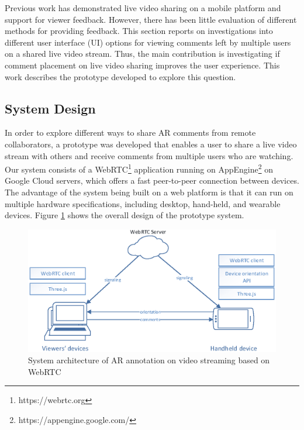 Previous work has demonstrated live video sharing on a mobile platform and support for viewer feedback. However, there has been little evaluation of different methods for providing feedback. This section reports on investigations into different user interface (UI) options for viewing comments left by multiple users on a shared live video stream. Thus, the main contribution is investigating if comment placement on live video sharing improves the user experience. This work describes the prototype developed to explore this question.

\subsection{System Design}

In order to explore different ways to share AR comments from remote collaborators, a prototype was developed that enables a user to share a live video stream with others and receive comments from multiple users who are watching. Our system consists of a WebRTC\footnote{https://webrtc.org} application running on AppEngine\footnote{https://appengine.google.com/} on Google Cloud servers, which offers a fast peer-to-peer connection between devices. The advantage of the system being built on a web platform is that it can run on multiple hardware specifications, including desktop, hand-held, and wearable devices. Figure \ref{fig:mgia16:system} shows the overall design of the prototype system.

\begin{figure}[ht]
  \centering
  \includegraphics[width=\linewidth]{images/61-video-mgia16/system}
  \caption{System architecture of AR annotation on video streaming based on WebRTC}
    \label{fig:mgia16:system}
\end{figure}

